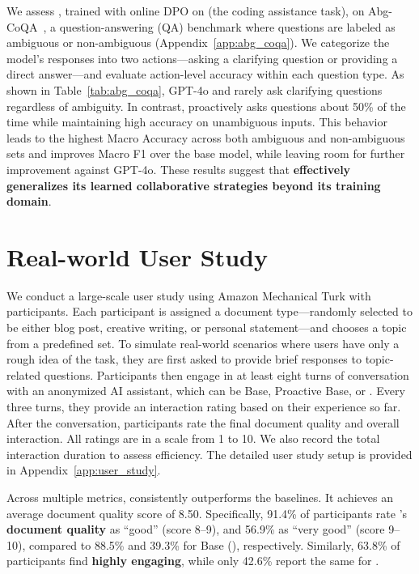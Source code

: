 We assess \name{}, trained with online DPO on \code (the coding assistance task), on Abg-CoQA~\cite{abg_coqa}, a question-answering (QA) benchmark where questions are labeled as ambiguous or non-ambiguous (\cf Appendix~\ref{app:abg_coqa}).
We categorize the model’s responses into two actions—asking a clarifying question or providing a direct answer—and evaluate action-level accuracy within each question type. 
As shown in Table~\ref{tab:abg_coqa}, 
GPT-4o and \llama{} rarely ask clarifying questions regardless of ambiguity. 
In contrast, 
\name{} proactively asks questions about 50\% of the time while maintaining high accuracy on unambiguous inputs.
This behavior leads to the highest Macro Accuracy across both ambiguous and non-ambiguous sets and improves Macro F1 over the base model, while leaving room for further improvement against GPT-4o. These results suggest that \textbf{\name{} effectively generalizes its learned collaborative strategies beyond its training domain}.

\section{Real-world User Study}

We conduct a large-scale user study using Amazon Mechanical Turk with \numturker{} participants. Each participant is assigned a document type---randomly selected to be either blog post, creative writing, or personal statement---and chooses a topic from a predefined set. To simulate real-world scenarios where users have only a rough idea of the task, they are first asked to provide brief responses to topic-related questions.
Participants then engage in at least eight turns of conversation with an anonymized AI assistant, which can be Base, Proactive Base, or \name{}. Every three turns, they provide an interaction rating based on their experience so far. After the conversation, participants rate the final document quality and overall interaction. All ratings are in a scale from 1 to 10. We also record the total interaction duration to assess efficiency.
The detailed user study setup is provided in Appendix~\ref{app:user_study}.

 Across multiple metrics, \name{} consistently outperforms the baselines. It achieves an average document quality score of 8.50. Specifically, 91.4\% of participants rate \name{}'s \textbf{document quality} as ``good'' (score 8–9), and 56.9\% as ``very good'' (score 9–10), compared to 88.5\% and 39.3\% for Base (\llama{}), respectively. Similarly, 63.8\% of participants find \name{} \textbf{highly engaging}, while only 42.6\% report the same for \llama{}. 

